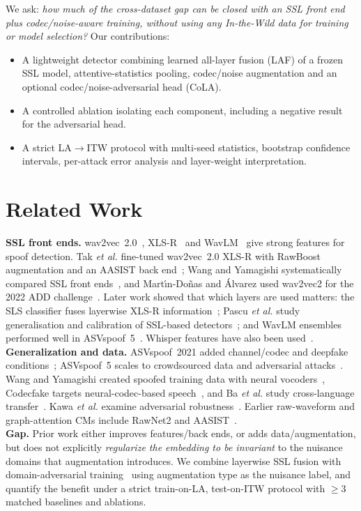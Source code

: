 \documentclass[conference]{IEEEtran}
\begin{document}
We ask: \emph{how much of the cross-dataset gap can be closed with an SSL front end plus codec/noise-aware training, without using any In-the-Wild data for training or model selection?} Our contributions:
\begin{itemize}
\item A lightweight detector combining learned all-layer fusion (LAF) of a frozen SSL model, attentive-statistics pooling, codec/noise augmentation and an optional codec/noise-adversarial head (CoLA).
\item A controlled ablation isolating each component, including a negative result for the adversarial head.
\item A strict LA$\rightarrow$ITW protocol with multi-seed statistics, bootstrap confidence intervals, per-attack error analysis and layer-weight interpretation.
\end{itemize}

\section{Related Work}
\textbf{SSL front ends.} wav2vec~2.0~\cite{baevski2020wav2vec}, XLS-R~\cite{babu2022xlsr} and WavLM~\cite{chen2022wavlm} give strong features for spoof detection. Tak \emph{et al.} fine-tuned wav2vec~2.0 XLS-R with RawBoost augmentation and an AASIST back end~\cite{tak2022wav2vec,tak2022rawboost,jung2022aasist}; Wang and Yamagishi systematically compared SSL front ends~\cite{wang2022investigating}, and Mart{\'\i}n-Do{\~n}as and {\'A}lvarez used wav2vec2 for the 2022 ADD challenge~\cite{martin2022vicomtech}. Later work showed that which layers are used matters: the SLS classifier fuses layerwise XLS-R information~\cite{zhang2024sls}; Pascu \emph{et al.} study generalisation and calibration of SSL-based detectors~\cite{pascu2024towards}; and WavLM ensembles performed well in ASVspoof~5~\cite{combei2024wavlm}. Whisper features have also been used~\cite{kawa2023whisper}.\\
\textbf{Generalization and data.} ASVspoof~2021 added channel/codec and deepfake conditions~\cite{liu2023asvspoof2021}; ASVspoof~5 scales to crowdsourced data and adversarial attacks~\cite{wang2024asvspoof5}. Wang and Yamagishi created spoofed training data with neural vocoders~\cite{wang2023vocoded,wang2024largescale}, Codecfake targets neural-codec-based speech~\cite{xu2024codecfake}, and Ba \emph{et al.} study cross-language transfer~\cite{ba2023transferring}. Kawa \emph{et al.} examine adversarial robustness~\cite{kawa2023defense}. Earlier raw-waveform and graph-attention CMs include RawNet2 and AASIST~\cite{tak2021rawnet2,jung2022aasist}.\\
\textbf{Gap.} Prior work either improves features/back ends, or adds data/augmentation, but does not explicitly \emph{regularize the embedding to be invariant} to the nuisance domains that augmentation introduces. We combine layerwise SSL fusion with domain-adversarial training~\cite{ganin2015dann} using augmentation type as the nuisance label, and quantify the benefit under a strict train-on-LA, test-on-ITW protocol with $\geq$3 matched baselines and ablations.
\end{document}
